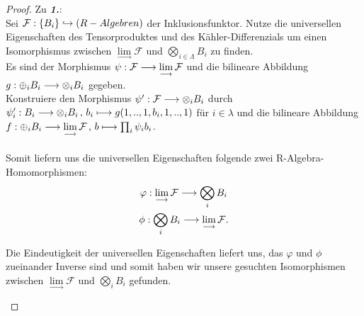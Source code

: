 \documentclass[10pt,a4paper]{report}
\newcommand{\functionfront}[3]{\nolinebreak{#1:#2 \longrightarrow #3}}
\newcommand{\function}[5]{\nolinebreak{#1:#2 \longrightarrow #3 \, , \, #4 \longmapsto #5}}
\newcommand{\colimes}[0]{\lim\limits_{ \longrightarrow }}
\newcommand{\infunctionfront}[3]{\nolinebreak{#1:#2 \hookrightarrow #3}}
\begin{document}
\begin{proof}
Zu \textit{\textbf{1.}}:\\
Sei $\infunctionfront{\mathcal{F}}{\lbrace B_i \rbrace}{(R-Algebren)}$ der Inklusionsfunktor. Nutze die universellen Eigenschaften des Tensorproduktes und des Kähler-Differenzials um einen Isomorphismus zwischen $\colimes \mathcal{F}$ und $\bigotimes_{i \in \Lambda} B_i$ zu finden.\\ Es sind der Morphismus $\functionfront{\psi}{\mathcal{F}}{\colimes \mathcal{F}}$ und die bilineare Abbildung $\functionfront{g}{\oplus_i B_i}{\otimes_i B_i}$ gegeben.\\
Konstruiere den Morphismus $\functionfront{\psi'}{\mathcal{F}}{\otimes_i B_i}$ durch $\function{\psi'_i}{B_i}{\otimes_i B_i}{b_i}{g(1,..,1,b_i,1,..,1)}$ für $i \in \lambda$ und die bilineare Abbildung $\function{f}{\oplus_i B_i}{\colimes \mathcal{F}}{b}{\prod_i \psi_i b_i}$.\\
\ \\
Somit liefern uns die universellen Eigenschaften folgende zwei R-Algebra-Homomorphismen:
\begin{gather*}
\functionfront{\varphi}{\colimes \mathcal{F}}{\bigotimes_i B_i} \\
\functionfront{\phi}{\bigotimes_i B_i}{\colimes \mathcal{F}}.
\end{gather*}
\begin{center}
\end{center}
Die Eindeutigkeit der universellen Eigenschaften liefert uns, das $\varphi$ und $\phi$ zueinander Inverse sind und somit haben wir unsere gesuchten Isomorphismen zwischen $\colimes \mathcal{F}$ und $\bigotimes_i B_i$ gefunden.
\begin{center}
\end{center}


\end{proof}
\end{document}
